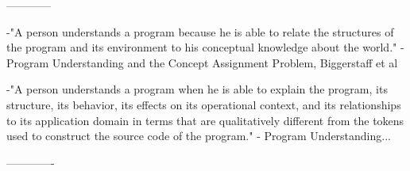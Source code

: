 ------------

-"A person understands a program because he is able to relate the structures of the program and its environment to his conceptual knowledge about the world." - Program Understanding and the Concept Assignment Problem, Biggerstaff et al

-"A person understands a program when he is able to explain the program, its structure, its behavior, its effects on its operational context, and its relationships to its application domain in terms that are qualitatively different from the tokens used to construct the source code of the program." - Program Understanding...

-------------



